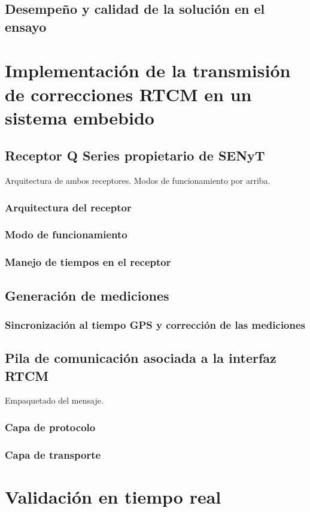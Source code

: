 \documentclass[a4paper,12pt,oneside,onecolumn,final,openright]{book}%
\begin{document}
\section{Desempeño y calidad de la solución en el ensayo}
\chapter{Implementación de la transmisión de correcciones RTCM en un sistema embebido} 

\section{Receptor Q Series propietario de SENyT}
Arquitectura de ambos receptores. Modos de funcionamiento por arriba. 
\subsection{Arquitectura del receptor}
\subsection{Modo de funcionamiento}
\subsection{Manejo de tiempos en el receptor}

\section{Generación de mediciones}
\subsection{Sincronización al tiempo GPS y corrección de las mediciones}

\section{Pila de comunicación asociada a la interfaz RTCM}
Empaquetado del mensaje.
\subsection{Capa de protocolo}
\subsection{Capa de transporte}

\chapter{Validación en tiempo real}
\end{document}
